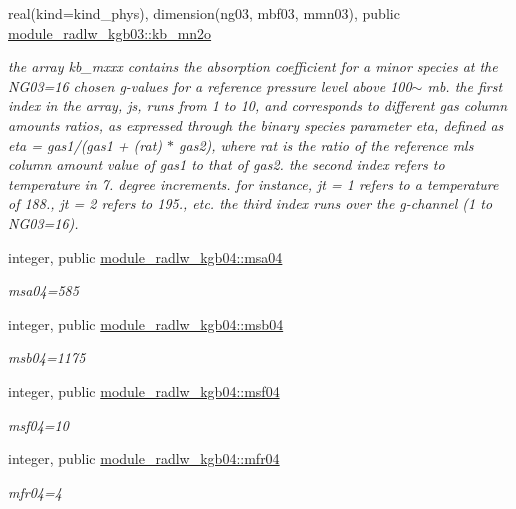 \begin{DoxyCompactItemize}
real(kind=kind\+\_\+phys), dimension(ng03, mbf03, mmn03), public \hyperlink{group__module__radlw__kgbnn_gaa2442e663e83b222648a86a34cd6631c}{module\+\_\+radlw\+\_\+kgb03\+::kb\+\_\+mn2o}
\begin{DoxyCompactList}\small\item\em the array kb\+\_\+mxxx contains the absorption coefficient for a minor species at the N\+G03=16 chosen g-\/values for a reference pressure level above 100$\sim$ mb. the first index in the array, js, runs from 1 to 10, and corresponds to different gas column amounts ratios, as expressed through the binary species parameter eta, defined as eta = gas1/(gas1 + (rat) $\ast$ gas2), where rat is the ratio of the reference mls column amount value of gas1 to that of gas2. the second index refers to temperature in 7. degree increments. for instance, jt = 1 refers to a temperature of 188., jt = 2 refers to 195., etc. the third index runs over the g-\/channel (1 to N\+G03=16). \end{DoxyCompactList}\item 
\mbox{\label{namespacemodule__radlw__kgb04_ac8c5caff005fd04d01009dd9e977d570}} 
integer, public \hyperlink{namespacemodule__radlw__kgb04_ac8c5caff005fd04d01009dd9e977d570}{module\+\_\+radlw\+\_\+kgb04\+::msa04}
\begin{DoxyCompactList}\small\item\em msa04=585 \end{DoxyCompactList}\item 
integer, public \hyperlink{group__module__radlw__kgbnn_gab9ce0111a156f7b80f2adaa9f3e84a32}{module\+\_\+radlw\+\_\+kgb04\+::msb04}
\begin{DoxyCompactList}\small\item\em msb04=1175 \end{DoxyCompactList}\item 
integer, public \hyperlink{group__module__radlw__kgbnn_ga4b38dd1165aca80e19697df7ae74a27a}{module\+\_\+radlw\+\_\+kgb04\+::msf04}
\begin{DoxyCompactList}\small\item\em msf04=10 \end{DoxyCompactList}\item 
integer, public \hyperlink{group__module__radlw__kgbnn_gab6ae25b4a793bf78ccd504685d639039}{module\+\_\+radlw\+\_\+kgb04\+::mfr04}
\begin{DoxyCompactList}\small\item\em mfr04=4 \end{DoxyCompactList}\item 

\end{DoxyCompactItemize}
